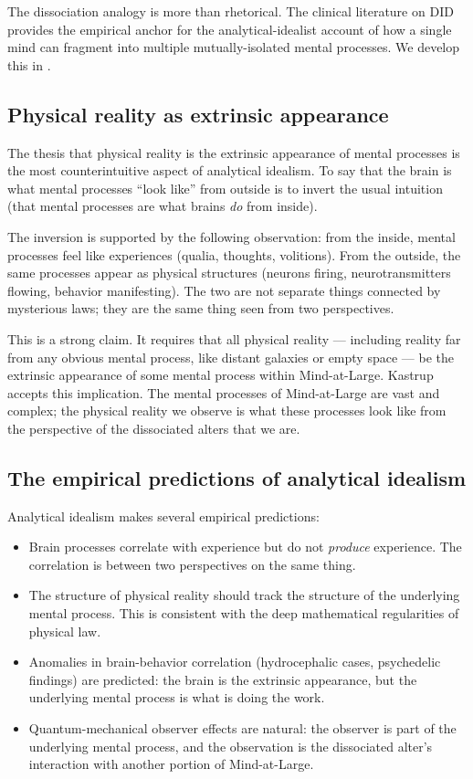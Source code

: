 The dissociation analogy is more than rhetorical. The clinical
literature on DID provides the empirical anchor for the
analytical-idealist account of how a single mind can fragment into
multiple mutually-isolated mental processes. We develop this in
.

\subsection{Physical reality as extrinsic appearance}

The thesis that physical reality is the extrinsic appearance of
mental processes is the most counterintuitive aspect of analytical
idealism. To say that the brain is what mental processes ``look
like'' from outside is to invert the usual intuition (that mental
processes are what brains \emph{do} from inside).

The inversion is supported by the following observation: from the
inside, mental processes feel like experiences (qualia, thoughts,
volitions). From the outside, the same processes appear as physical
structures (neurons firing, neurotransmitters flowing, behavior
manifesting). The two are not separate things connected by
mysterious laws; they are the same thing seen from two perspectives.

This is a strong claim. It requires that all physical reality ---
including reality far from any obvious mental process, like
distant galaxies or empty space --- be the extrinsic appearance of
some mental process within Mind-at-Large. Kastrup accepts this
implication. The mental processes of Mind-at-Large are vast and
complex; the physical reality we observe is what these processes
look like from the perspective of the dissociated alters that we
are.

\subsection{The empirical predictions of analytical idealism}

Analytical idealism makes several empirical predictions:

\begin{itemize}[leftmargin=2em]
    \item Brain processes correlate with experience but do not
    \emph{produce} experience. The correlation is between two
    perspectives on the same thing.
    \item The structure of physical reality should track the
    structure of the underlying mental process. This is consistent
    with the deep mathematical regularities of physical law.
    \item Anomalies in brain-behavior correlation (hydrocephalic
    cases, psychedelic findings) are predicted: the brain is the
    extrinsic appearance, but the underlying mental process is what
    is doing the work.
    \item Quantum-mechanical observer effects are natural: the
    observer is part of the underlying mental process, and the
    observation is the dissociated alter's interaction with another
    portion of Mind-at-Large.
\end{itemize}

